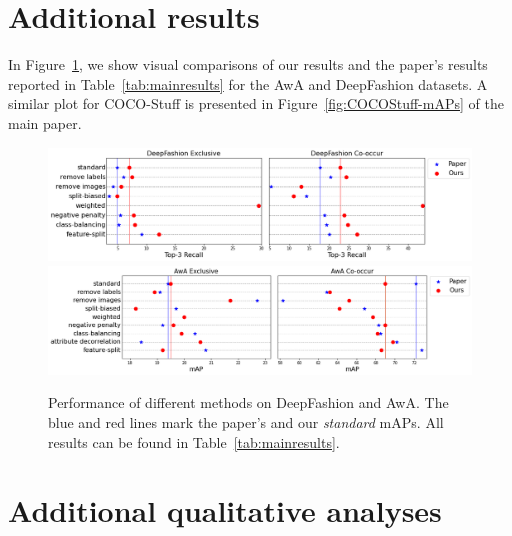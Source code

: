 \section{Additional results} \label{sec:additionalresults}

In Figure~\ref{fig:mAPs-comparison}, we show visual comparisons of our results and the paper's results reported in Table~\ref{tab:mainresults} for the AwA and DeepFashion datasets. A similar plot for COCO-Stuff is presented in Figure~\ref{fig:COCOStuff-mAPs} of the main paper.

\begin{figure}[h!]
    \centering
    \caption{Performance of different methods on DeepFashion and AwA. The blue and red lines mark the paper's and our \textit{standard} mAPs. All results can be found in Table~\ref{tab:mainresults}.}
    \label{fig:mAPs-comparison}
    \includegraphics[width=\textwidth]{../openreview/images/DeepFashion_maP_comparisons.png}
    \includegraphics[width=\textwidth]{../openreview/images/AwA_maP_comparisons.png}
\end{figure}



\section{Additional qualitative analyses}
\label{sec:qualitative}


